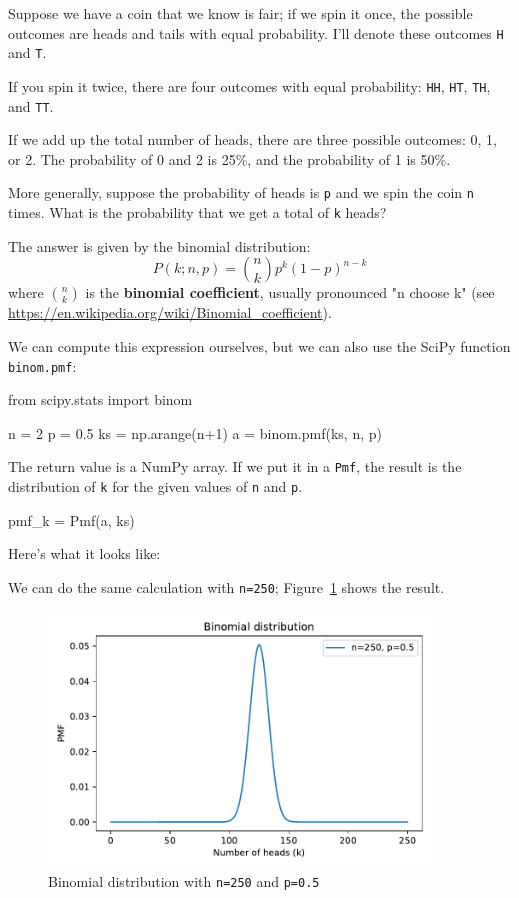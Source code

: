 \documentclass[12pt]{book}
\theoremstyle{exercise}
\newcommand{\py}[1]{{\tt #1}}%
\begin{document}
Suppose we have a coin that we know is fair; if we spin it once, the possible outcomes are heads and tails with equal probability.
I'll denote these outcomes \py{H} and \py{T}.

If you spin it twice, there are four outcomes with equal probability: \py{HH}, \py{HT}, \py{TH}, and \py{TT}.

If we add up the total number of heads, there are three possible outcomes: 0, 1, or 2.  The probability of 0 and 2 is 25\%, and the probability of 1 is 50\%.

More generally, suppose the probability of heads is \py{p} and we spin the coin \py{n} times.  What is the probability that we get a total of \py{k} heads?

The answer is given by the binomial distribution:
%
\[ P(k; n, p) = \binom{n}{k} p^k (1-p)^{n-k} \]
%
where $\binom{n}{k}$ is the {\bf binomial coefficient}, usually pronounced "n choose k" (see \url{https://en.wikipedia.org/wiki/Binomial_coefficient}).

We can compute this expression ourselves, but we can also use the SciPy function \py{binom.pmf}:

\begin{code}
from scipy.stats import binom

n = 2
p = 0.5
ks = np.arange(n+1)
a = binom.pmf(ks, n, p)
\end{code}

The return value is a NumPy array.
If we put it in a \py{Pmf}, the result is the distribution of \py{k} for the given values of \py{n} and \py{p}.

\begin{code}
pmf_k = Pmf(a, ks)
\end{code}

Here's what it looks like:



We can do the same calculation with \py{n=250}; Figure~\ref{fig03-01} shows the result.

\begin{figure}
\centerline{\includegraphics[width=4in]{figs/fig03-01.pdf}}
\caption{Binomial distribution with \py{n=250} and \py{p=0.5}}
\label{fig03-01}
\end{figure}
\end{document}
